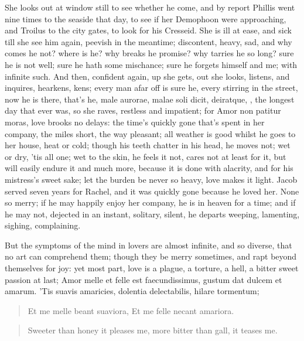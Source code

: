 She looks out at window still to see whether he come, and by
report Phillis went nine times to the seaside that day, to see if her
Demophoon were approaching, and Troilus to the city gates, to
look for his Cresseid. She is ill at ease, and sick till she see him
again, peevish in the meantime; discontent, heavy, sad, and why comes
he not? where is he? why breaks he promise? why tarries he so long?
sure he is not well; sure he hath some mischance; sure he forgets
himself and me; with infinite such. And then, confident again, up she
gets, out she looks, listens, and inquires, hearkens, kens; every man
afar off is sure he, every stirring in the street, now he is there,
that's he, male aurorae, malae soli dicit, deiratque, \etc{}, the longest
day that ever was, so she raves, restless and impatient; for Amor non
patitur moras, love brooks no delays: the time's quickly gone that's
spent in her company, the miles short, the way pleasant; all weather is
good whilst he goes to her house, heat or cold; though his teeth
chatter in his head, he moves not; wet or dry, 'tis all one; wet to the
skin, he feels it not, cares not at least for it, but will easily
endure it and much more, because it is done with alacrity, and for his
mistress's sweet sake; let the burden be never so heavy, love makes it
light. Jacob served seven years for Rachel, and it was quickly
gone because he loved her. None so merry; if he may happily enjoy her
company, he is in heaven for a time; and if he may not, dejected in an
instant, solitary, silent, he departs weeping, lamenting, sighing,
complaining.

But the symptoms of the mind in lovers are almost infinite, and so
diverse, that no art can comprehend them; though they be merry
sometimes, and rapt beyond themselves for joy: yet most part, love is a
plague, a torture, a hell, a bitter sweet passion at last; Amor
melle et felle est faecundissimus, gustum dat dulcem et amarum. 'Tis
suavis amaricies, dolentia delectabilis, hilare tormentum;

\begin{latin}
\begin{verse}
Et me melle beant suaviora,
Et me felle necant amariora.
\end{verse}
\end{latin}
\translationrule%
\begin{verse}%
Sweeter than honey it pleases me,
more bitter than gall, it teases me.
\end{verse}%

